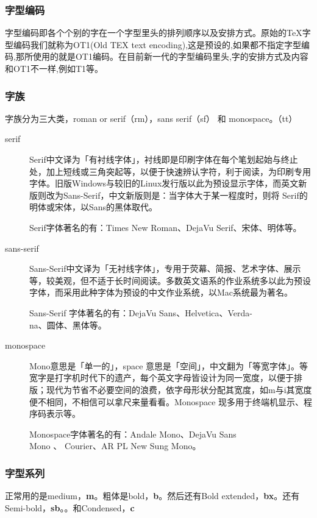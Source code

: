 \documentclass[12pt,oneside]{book}
\begin{document}
\begin{common-format}
\subsubsection{字型编码}
字型编码即各个个别的字在一个字型里头的排列顺序以及安排方式。原始的\TeX 字型编码我们就称为OT1(Old TEX text encoding),这是预设的,如果都不指定字型编码,那所使用的就是OT1编码。在目前新一代的字型编码里头,字的安排方式及内容和OT1不一样,例如T1等。


\subsubsection{字族}
字族分为三大类，roman or serif（rm），sans serif（sf） 和 monospace。（tt）


\begin{description}
\item[serif] Serif中文译为「有衬线字体」，衬线即是印刷字体在每个笔划起始与终止处，加上短线或三角突起等，以便于快速辨认字符，利于阅读，为印刷专用字体。旧版Windows与较旧的Linux发行版以此为预设显示字体，而英文新版则改为Sans-Serif，中文新版则是：当字体大于某一程度时，则将 Serif的明体或宋体，以Sans的黑体取代。

Serif字体著名的有：Times New Roman、DejaVu Serif、宋体、明体等。

\item[sans-serif] Sans-Serif中文译为「无衬线字体」，专用于荧幕、简报、艺术字体、展示等，较美观，但不适于长时间阅读。多数英文语系的作业系统多以此为预设字体，而采用此种字体为预设的中文作业系统，以Mac系统最为著名。

Sans-Serif 字体著名的有：DejaVu Sans、Helvetica、Verda-\\na、圆体、黑体等。

\item[monospace] Mono意思是「单一的」，space 意思是「空间」，中文翻为「等宽字体」。等宽字是打字机时代下的遗产，每个英文字母皆设计为同一宽度，以便于排版；现代为节省不必要空间的浪费，依字母形状分配其宽度，如m与i其宽度便不相同，不相信可以拿尺来量看看。Monospace 现多用于终端机显示、程序码表示等。

Monospace字体著名的有：Andale Mono、DejaVu Sans \\ Mono 、 Courier、AR PL New Sung Mono。
\end{description}


\subsubsection{字型系列}
正常用的是medium，\textbf{m}。粗体是bold，\textbf{b}。然后还有Bold extended，\textbf{bx}。还有Semi-bold，\textbf{sb}。。和Condensed，\textbf{c}



\end{common-format}
\end{document}
